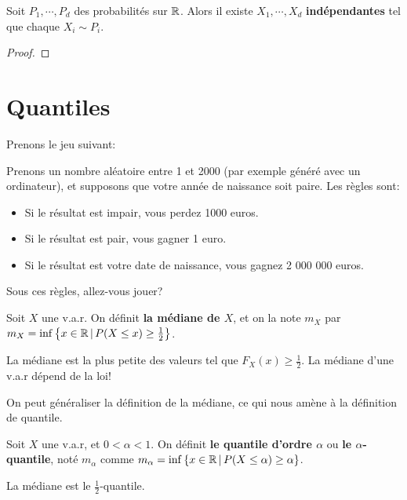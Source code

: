 \begin{proposition}
	Soit $P_{1}, \cdots, P_{d}$ des probabilités sur $\mathbb{R}$. Alors il existe
	$X_{1}, \cdots, X_{d}$ \textbf{indépendantes} tel que chaque $X_{i} \sim
	P_{i}$.
\end{proposition}

\begin{proof}

\end{proof}

\section{Quantiles}

Prenons le jeu suivant:

Prenons un nombre aléatoire entre 1 et 2000 (par exemple généré avec un
ordinateur), et supposons que votre année de naissance soit paire.
Les règles sont:

\begin{itemize}
	\item Si le résultat est impair, vous perdez 1000 euros.
	\item Si le résultat est pair, vous gagner 1 euro.
	\item Si le résultat est votre date de naissance, vous gagnez 2 000 000 euros.
\end{itemize}

Sous ces règles, allez-vous jouer?

\begin{definition}
	Soit $X$ une v.a.r. On définit \textbf{la médiane de $X$}, et on la note
	$m_{X}$ par $m_{X} = \inf\left\{ x \in \mathbb{R} \, | \, P(X \leq x) \geq
		\frac{1}{2} \right\}$.
\end{definition}

La médiane est la plus petite des valeurs tel que $F_{X}(x) \geq \frac{1}{2}$.
La médiane d'une v.a.r dépend de la loi!

On peut généraliser la définition de la médiane, ce qui nous amène à la
définition de quantile.

\begin{definition}
	Soit $X$ une v.a.r, et $0 < \alpha < 1$. On définit \textbf{le quantile
	d'ordre $\alpha$} ou \textbf{le $\alpha$-quantile}, noté $m_{\alpha}$ comme
	$m_{\alpha} = \inf\left\{ x \in \mathbb{R} \, | \, P(X \leq \alpha) \geq \alpha
	\right\}$.
\end{definition}

La médiane est le $\frac{1}{2}$-quantile.
